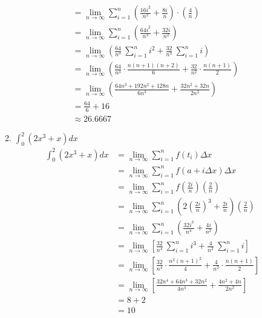 \documentclass[12pt,letterpaper]{article}
\theoremstyle{case}
\theoremstyle{definition}
\begin{document}
\begin{enumerate}
\begin{enumerate}
\begin{align*}
				&= \lim\limits_{n \to \infty} \sum_{i=1}^{n} \left(\frac{16i^2}{n^2}+\frac{8i}{n}\right)\cdot \left(\frac{4}{n}\right) \\
				&= \lim\limits_{n \to \infty} \sum_{i=1}^{n} \left(\frac{64i^2}{n^3}+\frac{32i}{n^2}\right) \\
				&= \lim\limits_{n \to \infty} \left(\frac{64}{n^3}\ \sum_{i=1}^{n} i^2 + \frac{32}{n^2}\ \sum_{i=1}^{n} i\right) \\
				&= \lim\limits_{n \to \infty} \left(\frac{64}{n^3}\cdot\frac{n(n+1)(n+2)}{6}+\frac{32}{n^2}\cdot \frac{n(n+1)}{2}\right) \\
				&= \lim\limits_{n \to \infty} \left(\frac{64n^3+192n^2+128n}{6n^3}+\frac{32n^2+32n}{2n^2}\right) \\
				&= \frac{64}{6} + 16 \\
				&\approx 26.6667
			\end{align*}
			\item $\int_{0}^{2} (2x^3+x)dx$
			\begin{align*}
				\int_{0}^{2} (2x^3+x)dx &= \lim\limits_{n \to \infty} \sum_{i=1}^{n} f(t_i)\Delta x \\
				&= \lim\limits_{n \to \infty} \sum_{i=1}^{n} f(a+i\Delta x)\Delta x \\
				&=\lim\limits_{n \to \infty} \sum_{i=1}^{n} f\left(\frac{2i}{n}\right)\left(\frac{2}{n}\right) \\
				&= \lim\limits_{n \to \infty} \sum_{i=1}^{n} \left(2\left(\frac{2i}{n}\right)^3+\frac{2i}{n}\right)\left(\frac{2}{n}\right) \\
				&= \lim\limits_{n \to \infty} \sum_{i=1}^{n} \left(\frac{32i^3}{n^4}+\frac{4i}{n^2}\right) \\
				&= \lim\limits_{n \to \infty} \left[\frac{32}{n^4}\ \sum_{i=1}^{n}i^3+\frac{4}{n^2}\ \sum_{i=1}^{n}i\right] \\
				&= \lim\limits_{n \to \infty} \left[\frac{32}{n^4}\cdot\frac{n^2(n+1)^2}{4}+\frac{4}{n^2}\cdot\frac{n(n+1)}{2}\right] \\
				&= \lim\limits_{n \to \infty} \left[\frac{32n^4+64n^3+32n^2}{4n^4}+\frac{4n^2+4n}{2n^2}\right] \\
				&= 8+2 \\
				&= 10
			\end{align*}
		\end{enumerate}

\end{enumerate}
\end{document}
